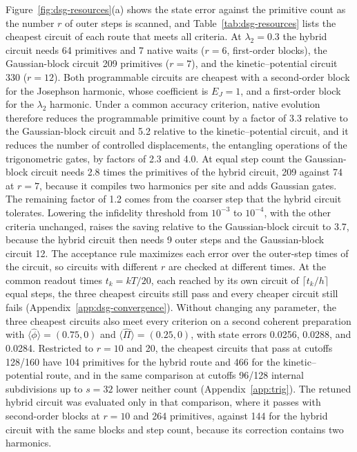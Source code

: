 \documentclass[pra,twocolumn,superscriptaddress,nofootinbib,floatfix]{revtex4-2}
\theoremstyle{remark}
\newcommand{\revcolor}{\color{blue}}
\DeclareRobustCommand{\rev}[1]{{\revcolor #1}}
\begin{document}
\rev{Figure~\ref{fig:dsg-resources}(a) shows the state error against the primitive count as the number \(r\) of outer steps is scanned, and Table~\ref{tab:dsg-resources} lists the cheapest circuit of each route that meets all criteria.} \rev{At \(\lambda_2=0.3\) the hybrid circuit needs 64 primitives and 7 native waits (\(r=6\), first-order blocks), the Gaussian-block circuit 209 primitives (\(r=7\)), and the kinetic--potential circuit 330 (\(r=12\)).} \rev{Both programmable circuits are cheapest with a second-order block for the Josephson harmonic, whose coefficient is \(E_J=1\), and a first-order block for the \(\lambda_2\) harmonic.} \rev{Under a common accuracy criterion, native evolution therefore reduces the programmable primitive count by a factor of 3.3 relative to the Gaussian-block circuit and 5.2 relative to the kinetic--potential circuit, and it reduces the number of controlled displacements, the entangling operations of the trigonometric gates, by factors of 2.3 and 4.0.} \rev{At equal step count the Gaussian-block circuit needs 2.8 times the primitives of the hybrid circuit, 209 against 74 at \(r=7\), because it compiles two harmonics per site and adds Gaussian gates.} \rev{The remaining factor of 1.2 comes from the coarser step that the hybrid circuit tolerates.} \rev{Lowering the infidelity threshold from \(10^{-3}\) to \(10^{-4}\), with the other criteria unchanged, raises the saving relative to the Gaussian-block circuit to 3.7, because the hybrid circuit then needs 9 outer steps and the Gaussian-block circuit 12.} \rev{The acceptance rule maximizes each error over the outer-step times of the circuit, so circuits with different \(r\) are checked at different times.} \rev{At the common readout times \(t_k=kT/20\), each reached by its own circuit of \(\lceil t_k/h\rceil\) equal steps, the three cheapest circuits still pass and every cheaper circuit still fails (Appendix~\ref{app:dsg-convergence}).} \rev{Without changing any parameter, the three cheapest circuits also meet every criterion on a second coherent preparation with \(\langle\hat\phi\rangle=(0.75,0)\) and \(\langle\hat\Pi\rangle=(0.25,0)\), with state errors 0.0256, 0.0288, and 0.0284.} \rev{Restricted to \(r=10\) and 20, the cheapest circuits that pass at cutoffs 128/160 have 104 primitives for the hybrid route and 466 for the kinetic--potential route, and in the same comparison at cutoffs 96/128 internal subdivisions up to \(s=32\) lower neither count (Appendix~\ref{app:trig}).} \rev{The retuned hybrid circuit was evaluated only in that comparison, where it passes with second-order blocks at \(r=10\) and 264 primitives, against 144 for the hybrid circuit with the same blocks and step count, because its correction contains two harmonics.}
\end{document}
